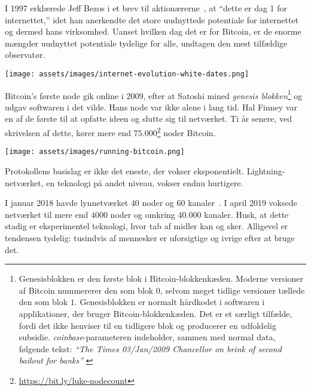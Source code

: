 I 1997 erklærede Jeff Bezos i et brev til aktionærerne~\cite{bezos-letter}, at \enquote{dette er dag 1 for internettet,} idet han anerkendte det store uudnyttede potentiale for internettet og dermed hans virksomhed. Uanset hvilken dag det er for Bitcoin, er de enorme mængder uudnyttet potentiale tydelige for alle, undtagen den mest tilfældige observatør.

\begin{center}
  \texttt{[image: assets/images/internet-evolution-white-dates.png]}
  \label{fig:internet-evolution-white-dates}
\end{center}

Bitcoin's første node gik online i 2009, efter at Satoshi mined \textit{genesis
blokken}\footnote{Genesisblokken er den første blok i Bitcoin-blokkenkæden.
Moderne versioner af Bitcoin nummererer den som blok $0$, selvom meget tidlige versioner
tællede den som blok $1$. Genesisblokken er normalt hårdkodet i
softwaren i applikationer, der bruger Bitcoin-blokkenkæden. Det er et
særligt tilfælde, fordi det ikke henviser til en tidligere blok og producerer en
udfoldelig subsidie. \textit{coinbase}-parameteren indeholder, sammen med
normal data, følgende tekst: \textit{\enquote{The Times 03/Jan/2009 Chancellor on
brink of second bailout for banks}} \cite{btcwiki:genesis-block}} og udgav
softwaren i det vilde. Hans node var ikke alene i lang tid. Hal Finney var en
af de første til at opfatte ideen og slutte sig til netværket. Ti år
senere, ved skrivelsen af dette, kører mere end
$75.000$\footnote{\url{https://bit.ly/luke-nodecount}} noder Bitcoin.

\begin{center}
  \centering
  \texttt{[image: assets/images/running-bitcoin.png]}
  \label{fig:running-bitcoin}
\end{center}

Protokollens basislag er ikke det eneste, der vokser eksponentielt.
Lightning-netværket, en teknologi på andet niveau, vokser endnu
hurtigere.

I januar 2018 havde lynnetværket $40$ noder og $60$
kanaler~\cite{web:lightning-nodes}. I april 2019 voksede netværket til mere
end $4000$ noder og omkring $40.000$ kanaler. Husk, at dette stadig er
eksperimentel teknologi, hvor tab af midler kan og sker. Alligevel er tendensen
tydelig: tusindvis af mennesker er uforsigtige og ivrige efter at bruge det.

